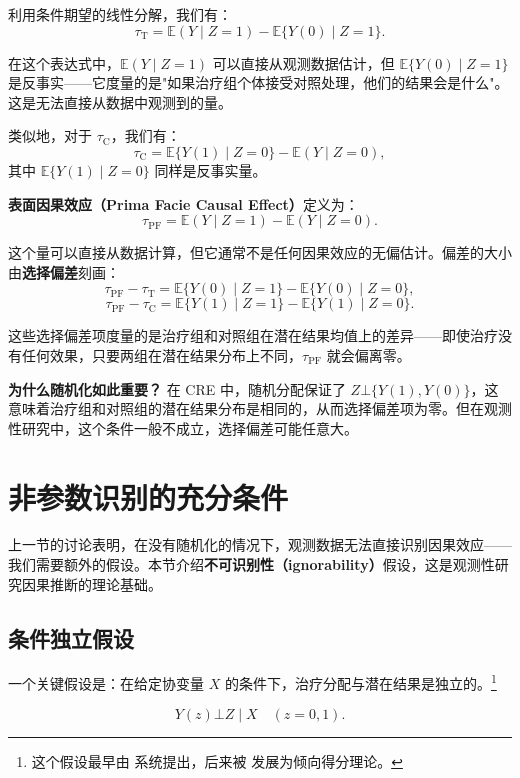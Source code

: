 利用条件期望的线性分解，我们有：
\[
\tau_{\mathrm{T}} = \mathbb{E}(Y \mid Z = 1) - \mathbb{E}\{Y(0) \mid Z = 1\}.
\]

在这个表达式中，$\mathbb{E}(Y \mid Z = 1)$ 可以直接从观测数据估计，但 $\mathbb{E}\{Y(0) \mid Z = 1\}$ 是反事实——它度量的是"如果治疗组个体接受对照处理，他们的结果会是什么"。这是无法直接从数据中观测到的量。

类似地，对于 $\tau_{\mathrm{C}}$，我们有：
\[
\tau_{\mathrm{C}} = \mathbb{E}\{Y(1) \mid Z = 0\} - \mathbb{E}(Y \mid Z = 0),
\]
其中 $\mathbb{E}\{Y(1) \mid Z = 0\}$ 同样是反事实量。

\textbf{表面因果效应（Prima Facie Causal Effect）}定义为：
\[
\tau_{\mathrm{PF}} = \mathbb{E}(Y \mid Z = 1) - \mathbb{E}(Y \mid Z = 0).
\]

这个量可以直接从数据计算，但它通常不是任何因果效应的无偏估计。偏差的大小由\textbf{选择偏差}刻画：
\[
\tau_{\mathrm{PF}} - \tau_{\mathrm{T}} = \mathbb{E}\{Y(0) \mid Z = 1\} - \mathbb{E}\{Y(0) \mid Z = 0\},
\]
\[
\tau_{\mathrm{PF}} - \tau_{\mathrm{C}} = \mathbb{E}\{Y(1) \mid Z = 1\} - \mathbb{E}\{Y(1) \mid Z = 0\}.
\]

这些选择偏差项度量的是治疗组和对照组在潜在结果均值上的差异——即使治疗没有任何效果，只要两组在潜在结果分布上不同，$\tau_{\mathrm{PF}}$ 就会偏离零。

\textbf{为什么随机化如此重要？} 在 CRE 中，随机分配保证了 $Z \bot \{Y(1), Y(0)\}$，这意味着治疗组和对照组的潜在结果分布是相同的，从而选择偏差项为零。但在观测性研究中，这个条件一般不成立，选择偏差可能任意大。

\section{非参数识别的充分条件}\label{sec:10-identification}

上一节的讨论表明，在没有随机化的情况下，观测数据无法直接识别因果效应——我们需要额外的假设。本节介绍\textbf{不可识别性（ignorability）}假设，这是观测性研究因果推断的理论基础。

\subsection{条件独立假设}\label{sec:10-ignorability}

一个关键假设是：在给定协变量 $X$ 的条件下，治疗分配与潜在结果是独立的。\footnote{这个假设最早由 \cite{Rubin:1978} 系统提出，后来被 \cite{Rosenbaum:1983} 发展为倾向得分理论。}

\begin{Assumption}\label{ass:ignorability}\label{def:10-1}
\[
Y(z) \bot Z \mid X \quad (z = 0, 1).
\]
\end{Assumption}

